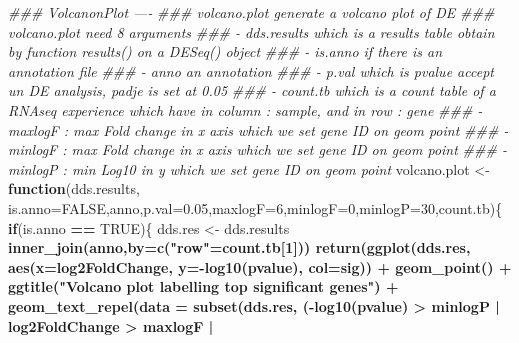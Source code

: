 \documentclass[
  12pt,
]{article}
\newenvironment{Shaded}{\begin{snugshade}}{\end{snugshade}}
\newcommand{\CommentTok}[1]{\textcolor[rgb]{0.56,0.35,0.01}{\textit{#1}}}
\newcommand{\ControlFlowTok}[1]{\textcolor[rgb]{0.13,0.29,0.53}{\textbf{#1}}}
\newcommand{\DataTypeTok}[1]{\textcolor[rgb]{0.13,0.29,0.53}{#1}}
\newcommand{\DecValTok}[1]{\textcolor[rgb]{0.00,0.00,0.81}{#1}}
\newcommand{\FloatTok}[1]{\textcolor[rgb]{0.00,0.00,0.81}{#1}}
\newcommand{\KeywordTok}[1]{\textcolor[rgb]{0.13,0.29,0.53}{\textbf{#1}}}
\newcommand{\NormalTok}[1]{#1}
\newcommand{\OperatorTok}[1]{\textcolor[rgb]{0.81,0.36,0.00}{\textbf{#1}}}
\newcommand{\OtherTok}[1]{\textcolor[rgb]{0.56,0.35,0.01}{#1}}
\newcommand{\StringTok}[1]{\textcolor[rgb]{0.31,0.60,0.02}{#1}}
\begin{document}
\begin{Shaded}
\begin{Highlighting}[]
{\CommentTok{### VolcanonPlot ---- }
\CommentTok{### volcano.plot generate a volcano plot of DE}
\CommentTok{### volcano.plot need 8 arguments}
\CommentTok{###   - dds.results which is a results table obtain by function results() on a DESeq() object}
\CommentTok{###   - is.anno if there is an annotation file}
\CommentTok{###   - anno an annotation }
\CommentTok{###   - p.val which is pvalue accept un DE analysis, padje is set at 0.05}
\CommentTok{###   - count.tb which is a count table of a RNAseq experience which have in column : sample, and in row : gene}
\CommentTok{###   - maxlogF : max Fold change in x axis which we set gene ID on geom point}
\CommentTok{###   - minlogF : max Fold change in x axis which we set gene ID on geom point}
\CommentTok{###   - minlogP : min Log10 in y which we set gene ID on geom point}
\NormalTok{volcano.plot <-}\ControlFlowTok{function}\NormalTok{(dds.results, }\DataTypeTok{is.anno=}\OtherTok{FALSE}\NormalTok{,anno,}\DataTypeTok{p.val=}\FloatTok{0.05}\NormalTok{,}\DataTypeTok{maxlogF=}\DecValTok{6}\NormalTok{,}\DataTypeTok{minlogF=}\DecValTok{0}\NormalTok{,}\DataTypeTok{minlogP=}\DecValTok{30}\NormalTok{,count.tb)\{}
  \ControlFlowTok{if}\NormalTok{(is.anno }\OperatorTok{==}\StringTok{ }\OtherTok{TRUE}\NormalTok{)\{}
\NormalTok{    dds.res <-}\StringTok{ }\NormalTok{dds.results }\OperatorTok{%
\StringTok{      }\KeywordTok{inner_join}\NormalTok{(anno,}\DataTypeTok{by=}\KeywordTok{c}\NormalTok{(}\StringTok{"row"}\NormalTok{=count.tb[}\DecValTok{1}\NormalTok{]))}
    \KeywordTok{return}\NormalTok{(}\KeywordTok{ggplot}\NormalTok{(dds.res, }\KeywordTok{aes}\NormalTok{(}\DataTypeTok{x=}\NormalTok{log2FoldChange, }\DataTypeTok{y=}\OperatorTok{-}\KeywordTok{log10}\NormalTok{(pvalue), }\DataTypeTok{col=}\NormalTok{sig)) }\OperatorTok{+}
\StringTok{             }\KeywordTok{geom_point}\NormalTok{() }\OperatorTok{+}
\StringTok{             }\KeywordTok{ggtitle}\NormalTok{(}\StringTok{"Volcano plot labelling top significant genes"}\NormalTok{) }\OperatorTok{+}
\StringTok{             }\KeywordTok{geom_text_repel}\NormalTok{(}\DataTypeTok{data =} \KeywordTok{subset}\NormalTok{(dds.res, }
\NormalTok{                                           (}\OperatorTok{-}\KeywordTok{log10}\NormalTok{(pvalue) }\OperatorTok{>}\StringTok{ }\NormalTok{minlogP }\OperatorTok{|}\StringTok{ }
\StringTok{                                              }\NormalTok{log2FoldChange }\OperatorTok{>}\StringTok{ }\NormalTok{maxlogF }\OperatorTok{|}\StringTok{ }
}}
\end{Highlighting}
\end{Shaded}
\end{document}
